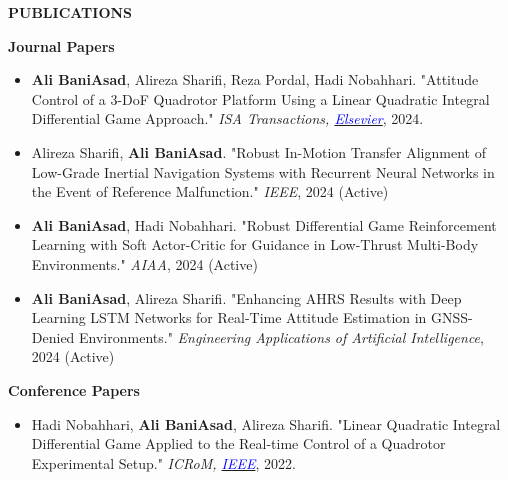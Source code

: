 \documentclass[12pt]{article}
\begin{document}
\vspace{0.2in} %

\newpage
\begin{center}
	{\noindent \bfseries PUBLICATIONS}
\end{center}

\vspace{8pt} %


\noindent
{\bfseries Journal Papers}
\vspace{6pt}


\begin{itemize} \itemsep -2pt %
	\item \textbf{Ali BaniAsad}, Alireza Sharifi, Reza Pordal, Hadi Nobahhari. "Attitude Control of a 3-DoF Quadrotor Platform Using a Linear Quadratic Integral Differential Game Approach." \textit{ISA Transactions, 
        \href{https://doi.org/10.1016/j.isatra.2024.03.005}{\textcolor{blue}{Elsevier}}}, 2024.
	\item Alireza Sharifi, \textbf{Ali BaniAsad}. "Robust In-Motion Transfer Alignment of Low-Grade Inertial Navigation Systems with Recurrent Neural Networks in the Event of Reference Malfunction." \textit{IEEE}, 2024 (Active)
	\item \textbf{Ali BaniAsad}, Hadi Nobahhari. "Robust Differential Game Reinforcement Learning with Soft Actor-Critic for Guidance in Low-Thrust Multi-Body Environments." \textit{AIAA}, 2024 (Active)
	\item \textbf{Ali BaniAsad}, Alireza Sharifi. "Enhancing AHRS Results with Deep Learning LSTM Networks for Real-Time Attitude Estimation in GNSS-Denied Environments." \textit{Engineering Applications of Artificial Intelligence}, 2024 (Active) 
\end{itemize}

\vspace{0.2in} %
\noindent
{\bfseries Conference Papers}

\vspace{6pt}
\begin{itemize} \itemsep -2pt %
	\item Hadi Nobahhari,  \textbf{Ali BaniAsad}, Alireza Sharifi. "Linear Quadratic Integral Differential Game Applied to the Real-time Control of a Quadrotor Experimental Setup." \textit{ICRoM, \href{https://doi.org/10.1109/ICRoM57054.2022.10025263}{\textcolor{blue}{IEEE}}}, 2022.
\end{itemize}
\end{document}
